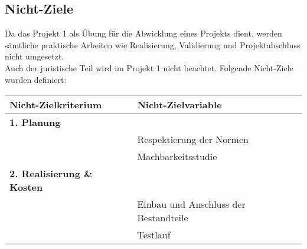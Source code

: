 \subsection{Nicht-Ziele}
Da das Projekt 1 als Übung für die Abwicklung eines Projekts dient, werden sämtliche praktische Arbeiten wie Realisierung, Validierung und Projektabschluss nicht umgesetzt.\\
Auch der juristische Teil wird im Projekt 1 nicht beachtet.
Folgende Nicht-Ziele wurden definiert:
\begin{table}[H]
\begin{tabular}{ll}
\textbf{Nicht-Zielkriterium}				&\textbf{Nicht-Zielvariable}											\\
\hline
\rowcolor{grau}
\textbf{1. Planung}						&																	\\
										&Respektierung der Normen											\\
										&Machbarkeitsstudie													\\
\rowcolor{grau}
\textbf{2. Realisierung \& Kosten}		&																	\\
										&Einbau und Anschluss der Bestandteile\\
										&Testlauf															\\		
\hline
\end{tabular}
\end{table}
